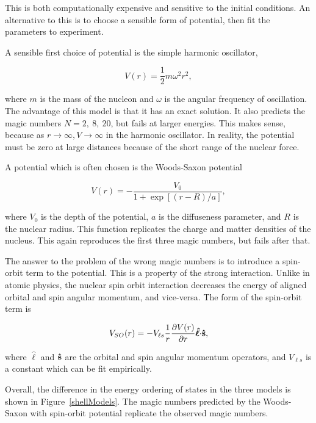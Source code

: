 This is both computationally expensive and sensitive to the initial conditions. An alternative to this is to choose a sensible form of potential, then fit the parameters to experiment.

A sensible first choice of potential is the simple harmonic oscillator,

\begin{equation}
V(r) = \frac{1}{2}m \omega^2 r^2\mathrm{,}
\end{equation}

where $m$ is the mass of the nucleon and $\omega$ is the angular frequency of oscillation. The advantage of this model is that it has an exact solution. It also predicts the magic numbers $N = 2,~8,~20$, but fails at larger energies. This makes sense, because as $r \to \infty, V \to \infty$ in the harmonic oscillator. In reality, the potential must be zero at large distances because of the short range of the nuclear force. 

A potential which is often chosen is the Woods-Saxon potential\cite{woodssaxon}

\begin{equation}
V(r) = - \frac{V_0}{1 + \exp [(r - R)/a ]}\mathrm{,}
\end{equation}

where $V_0$ is the depth of the potential, $a$ is the diffuseness parameter, and $R$ is the nuclear radius. This function replicates the charge and matter densities of the nucleus. This again reproduces the first three magic numbers, but fails after that. 

The answer to the problem of the wrong magic numbers is to introduce a spin-orbit term to the potential\cite{mayer,jensen}. This is a property  of the strong interaction. Unlike in atomic physics, the nuclear spin orbit interaction decreases the energy of aligned orbital and spin angular momentum, and vice-versa. The form of the spin-orbit term is

\begin{equation}
V_{SO}(r) = -V_{\ell s}\frac{1}{r}\frac{\partial V(r)}{\partial r} \boldsymbol{\hat{\ell}} {\bf \cdot} {\bf \hat{s}} \mathrm{,}
\end{equation}

where $\boldsymbol{\hat{\ell}}$ and ${\bf \hat{s}}$ are the orbital and spin angular momentum operators, and $V_{\ell s}$ is a constant which can be fit empirically.

Overall, the difference in the energy ordering of states in the three models is shown in Figure~\ref{shellModels}. The magic numbers predicted by the Woods-Saxon with spin-orbit potential replicate the observed magic numbers.

